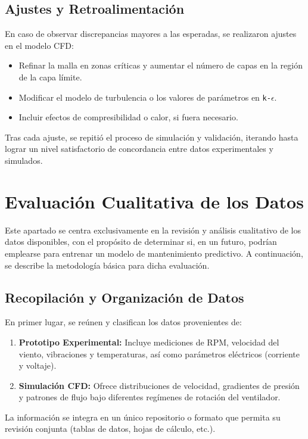 \subsection{Ajustes y Retroalimentación}
En caso de observar discrepancias mayores a las esperadas, se realizaron ajustes en el modelo CFD:
\begin{itemize}
    \item Refinar la malla en zonas críticas y aumentar el número de capas en la región de la capa límite.
    \item Modificar el modelo de turbulencia o los valores de parámetros en \texttt{k-$\epsilon$}.
    \item Incluir efectos de compresibilidad o calor, si fuera necesario.
\end{itemize}

Tras cada ajuste, se repitió el proceso de simulación y validación, iterando hasta lograr un nivel satisfactorio de concordancia entre datos experimentales y simulados.

\section{Evaluación Cualitativa de los Datos}

Este apartado se centra exclusivamente en la revisión y análisis cualitativo de los datos disponibles, con el propósito de determinar si, en un futuro, podrían emplearse para entrenar un modelo de mantenimiento predictivo. A continuación, se describe la metodología básica para dicha evaluación.

\subsection{Recopilación y Organización de Datos}
En primer lugar, se reúnen y clasifican los datos provenientes de:
\begin{enumerate}
    \item \textbf{Prototipo Experimental:} Incluye mediciones de RPM, velocidad del viento, vibraciones y temperaturas, así como parámetros eléctricos (corriente y voltaje).
    \item \textbf{Simulación CFD:} Ofrece distribuciones de velocidad, gradientes de presión y patrones de flujo bajo diferentes regímenes de rotación del ventilador.
\end{enumerate}
La información se integra en un único repositorio o formato que permita su revisión conjunta (tablas de datos, hojas de cálculo, etc.).

